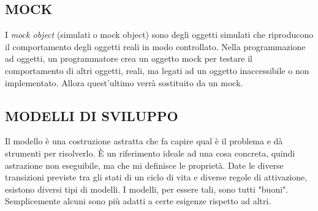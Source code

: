 		\subsection{MOCK}		\label{mock}
		I \textit{mock object} (simulati o mock object) sono degli oggetti simulati che riproducono il comportamento degli oggetti reali in modo controllato. Nella programmazione ad oggetti, un programmatore crea un oggetto mock per testare il comportamento di altri oggetti, reali, ma legati ad un oggetto inaccessibile o non implementato. Allora quest'ultimo verrà sostituito da un mock.


		\subsection{MODELLI DI SVILUPPO}  \label{modelli}
		Il modello è una costruzione astratta che fa capire qual è il problema e dà strumenti per risolverlo. È un riferimento ideale ad una cosa concreta, quindi astrazione non eseguibile, ma che mi definisce le proprietà. Date le diverse transizioni previste tra gli stati di un ciclo di vita e diverse regole di attivazione, esistono diversi tipi di modelli.
		I modelli, per essere tali, sono tutti "buoni". Semplicemente alcuni sono più adatti a certe esigenze rispetto ad altri.
